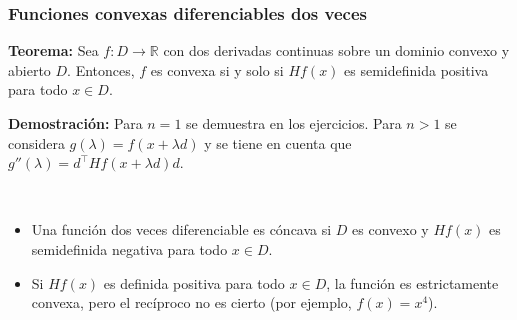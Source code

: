 \documentclass{beamer}
\begin{document}
\begin{frame}
\frametitle{Funciones convexas diferenciables dos veces}




\textbf{Teorema:} Sea $f:D\to\mathbb{R}$  con dos derivadas continuas sobre un dominio convexo y abierto $D$. Entonces, $f$ es convexa si y solo si $Hf(x)$ es semidefinida positiva para todo $x\in D$.

{\scriptsize
\textbf{Demostración:}
 Para $n=1$ se demuestra en los ejercicios. Para $n>1$ se considera $g(\lambda)=f(x+\lambda d)$ y se tiene en cuenta que $g''(\lambda)=d^\top Hf(x+\lambda d)d$.
}

\

\begin{itemize}
\item Una función dos veces diferenciable es cóncava si $D$ es convexo y $Hf(x)$ es semidefinida negativa para todo $x\in D$.

\item Si $Hf(x)$ es definida positiva para todo $x\in D$, la función es estrictamente convexa, pero el recíproco no es cierto (por ejemplo, $f(x)=x^4$).


\end{itemize}



\end{frame}
\end{document}
